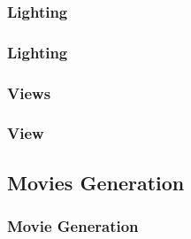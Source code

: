 \begin{frame}
\begin{columns}
\begin{column}{4.5cm}
\end{column}
\end{columns}
\end{frame}


\subsubsection{Lighting}
\begin{frame}
\frametitle{Lighting}


\end{frame}


\subsubsection{Views}
\begin{frame}
\frametitle{View}


\end{frame}



\subsection{Movies Generation}

\begin{frame}
\frametitle{Movie Generation}

\end{frame}

